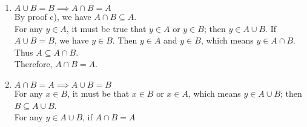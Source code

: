 \documentclass[12pt]{article}
\begin{document}
\begin{flushleft}
\begin{enumerate}
    \item \(A \cup B = B \implies A \cap B = A\)\\
    By proof c), we have \(A \cap B \subseteq A\).\\
    For any \(y \in A\), it must be true that \(y \in A\) or \(y \in B\); then \(y \in A \cup B\). If \(A \cup B = B\), we have \(y \in B\). Then \(y \in A\) and \(y \in B\), which means \(y \in A \cap B\). Thus \(A \subseteq A \cap B\).\\
    Therefore, \(A \cap B = A\).

    \item \(A \cap B =A \implies A \cup B =B \)\\
    For any \(x \in B\), it must be that \(x \in B\) or \(x \in A\), which means \(y \in A \cup B\); then \(B \subseteq A \cup B\).\\
    For any \(y \in A \cup B\), if \(A \cap B = A\)
\end{enumerate}



\end{flushleft}
\end{document}
